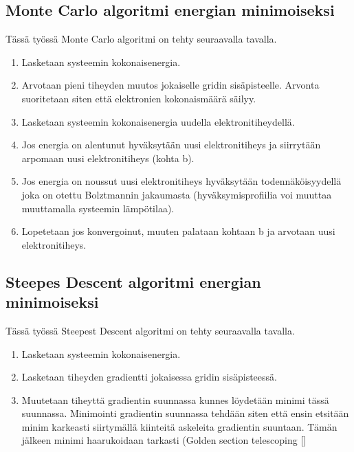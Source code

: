 \documentclass{article}
\begin{document}
\subsection{Monte Carlo algoritmi energian minimoiseksi}
Tässä työssä Monte Carlo algoritmi on tehty seuraavalla tavalla.
\begin{enumerate}
\item Lasketaan systeemin kokonaisenergia.
\item Arvotaan pieni tiheyden muutos jokaiselle gridin
  sisäpisteelle. Arvonta suoritetaan siten että elektronien
  kokonaismäärä säilyy.
\item Lasketaan systeemin kokonaisenergia uudella elektronitiheydellä.
\item Jos energia on alentunut hyväksytään uusi elektronitiheys ja
  siirrytään arpomaan uusi elektronitiheys (kohta b).
\item Jos energia on noussut uusi elektronitiheys hyväksytään
  todennäköisyydellä joka on otettu Bolztmannin jakaumasta
  (hyväksymisprofiilia voi muuttaa muuttamalla systeemin lämpötilaa).
\item Lopetetaan jos konvergoinut, muuten palataan kohtaan b ja
  arvotaan uusi elektronitiheys.
\end{enumerate}

\subsection{Steepes Descent algoritmi energian minimoiseksi}
Tässä työssä Steepest Descent algoritmi on tehty seuraavalla tavalla.
\begin{enumerate}
\item Lasketaan systeemin kokonaisenergia.
\item Lasketaan tiheyden gradientti jokaisessa gridin sisäpisteessä.
\item Muutetaan tiheyttä gradientin suunnassa kunnes löydetään minimi
  tässä suunnassa. Minimointi gradientin suunnassa tehdään siten että
  ensin etsitään minim karkeasti siirtymällä kiinteitä askeleita
  gradientin suuntaan. Tämän jälkeen minimi haarukoidaan tarkasti
  (Golden section telescoping [\cite{kiusalaas2013numerical}]
\end{enumerate}
\end{document}
